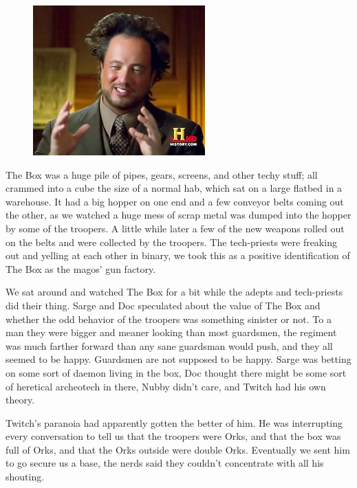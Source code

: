 \begin{figure}
	\begin{center}
		\includegraphics[width=\figwidth]{pics/4/19.png}
	\end{center}
\end{figure}
The Box was a huge pile of pipes, gears, screens, and other techy stuff; all crammed into a cube the size of a normal hab, which sat on a large flatbed in a warehouse. 
It had a big hopper on one end and a few conveyor belts coming out the other, as we watched a huge mess of scrap metal was dumped into the hopper by some of the troopers. 
A little while later a few of the new weapons rolled out on the belts and were collected by the troopers. 
The tech-priests were freaking out and yelling at each other in binary, we took this as a positive identification of The Box as the magos' gun factory.

We sat around and watched The Box for a bit while the adepts and tech-priests did their thing. 
Sarge and Doc speculated about the value of The Box and whether the odd behavior of the troopers was something sinister or not. 
To a man they were bigger and meaner looking than most guardsmen, the regiment was much farther forward than any sane guardsman would push, and they all seemed to be happy. 
Guardsmen are not supposed to be happy. 
Sarge was betting on some sort of daemon living in the box, Doc thought there might be some sort of heretical archeotech in there, Nubby didn't care, and Twitch had his own theory.

Twitch's paranoia had apparently gotten the better of him. 
He was interrupting every conversation to tell us that the troopers were Orks, and that the box was full of Orks, and that the Orks outside were double Orks.
Eventually we sent him to go secure us a base, the nerds said they couldn't concentrate with all his shouting.

